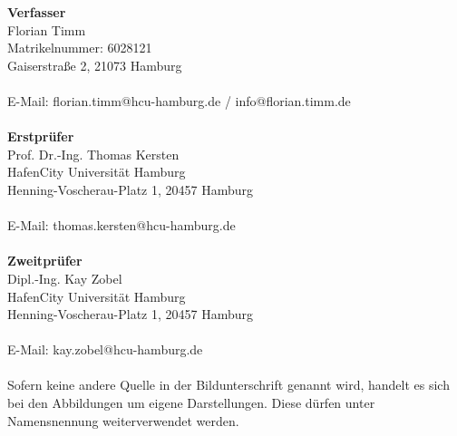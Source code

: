 \documentclass[a4paper,12pt,bibliography=totoc, listof=totoc, titlepage]{scrreprt}
\begin{document}
\vspace{1cm}
\noindent\textbf{\large Verfasser}\\
Florian Timm\\
Matrikelnummer: 6028121\\
Gaiserstraße 2, 21073 Hamburg\\
\\
E-Mail: florian.timm@hcu-hamburg.de / info@florian.timm.de \\
\vspace{2cm}\\
\noindent\textbf{\large Erstprüfer}\\
Prof. Dr.-Ing. Thomas Kersten\\
HafenCity Universität Hamburg\\
Henning-Voscherau-Platz 1, 20457 Hamburg\\
\\
E-Mail: thomas.kersten@hcu-hamburg.de\\
\vspace{2cm}\\
\textbf{\large Zweitprüfer}\\
Dipl.-Ing. Kay Zobel\\
HafenCity Universität Hamburg\\
Henning-Voscherau-Platz 1, 20457 Hamburg\\
\\
E-Mail: kay.zobel@hcu-hamburg.de\\
\vspace{4cm}\\
Sofern keine andere Quelle in der Bildunterschrift genannt wird, handelt es sich bei den Abbildungen um eigene Darstellungen. Diese dürfen unter Namensnennung weiterverwendet werden.
\newpage
\end{document}
